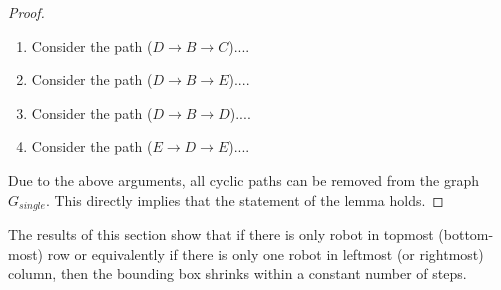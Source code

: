 \begin{proof}
\begin{enumerate}
\item Consider the path ($D \rightarrow B \rightarrow C$)....

\item Consider the path ($D \rightarrow B \rightarrow E$)....

\item Consider the path ($D \rightarrow B \rightarrow D$)....

\item Consider the path ($E \rightarrow D \rightarrow E$)....

\end{enumerate}
Due to the above arguments, all cyclic paths can be removed from the graph $G_{single}$. This directly implies that the statement of the lemma holds.
\end{proof}

The results of this section show that if there is only robot in topmost (bottom-most) row or equivalently if there is only one robot in leftmost (or rightmost)  column, then the bounding box shrinks within a constant number of steps.